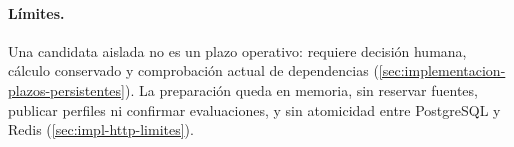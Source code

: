 \paragraph{Límites.} Una candidata aislada no es un plazo operativo: requiere decisión humana, cálculo conservado y comprobación actual de dependencias (\cref{sec:implementacion-plazos-persistentes}). La preparación queda en memoria, sin reservar fuentes, publicar perfiles ni confirmar evaluaciones, y sin atomicidad entre PostgreSQL y Redis (\cref{sec:impl-http-limites}).

